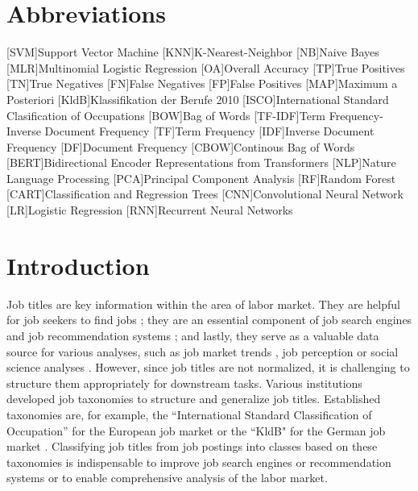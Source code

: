 \documentclass[12pt, a4paper, titlepage]{article}
\begin{document}
\section*{Abbreviations}
\begin{acronym}
  [SVM]{Support Vector Machine}
  [KNN]{K-Nearest-Neighbor}
  [NB]{Naive Bayes}
  [MLR]{Multinomial Logistic Regression}
  [OA]{Overall Accuracy}
  [TP]{True Positives}
  [TN]{True Negatives}
  [FN]{False Negatives}
  [FP]{False Positives}
  [MAP]{Maximum a Posteriori}
  [KldB]{Klassifikation der Berufe 2010}
  [ISCO]{International Standard Clasification of Occupations}
  [BOW]{Bag of Words}
  [TF-IDF]{Term Frequency-Inverse Document Frequency}
  [TF]{Term Frequency}
  [IDF]{Inverse Document Frequency}
  [DF]{Document Frequency}
  [CBOW]{Continous Bag of Words}
  [BERT]{Bidirectional Encoder Representations from Transformers}
  [NLP]{Nature Language Processing}
  [PCA]{Principal Component Analysis}
  [RF]{Random Forest}
  [CART]{Classification and Regression Trees}
  [CNN]{Convolutional Neural Network}
  [LR]{Logistic Regression}
  [RNN]{Recurrent Neural Networks}
\end{acronym}
\newpage

\section{Introduction}
Job titles are key information within the area of labor market. They are helpful for job seekers to find jobs \citep{marinescu2020}; they are an essential component of job search engines \citep{slamet2018, javed2015, javed2016} and job recommendation systems \citep{malherbe2014}; and lastly, they serve as a valuable data source for various analyses, such as job market trends \citep{martin2021, li2021}, job perception \citep{smith1989, boydston2020} or social science analyses \citep{martin2021}. However, since job titles are not normalized, it is challenging to structure them appropriately for downstream tasks. Various institutions developed job taxonomies to structure and generalize job titles. Established taxonomies are, for example, the ``International Standard Classification of Occupation'' for the European job market or the ``\ac{KldB}" for the German job market \citep{uter2020}. Classifying job titles from job postings into classes based on these taxonomies is indispensable to improve job search engines or recommendation systems or to enable comprehensive analysis of the labor market. 
\end{document}
